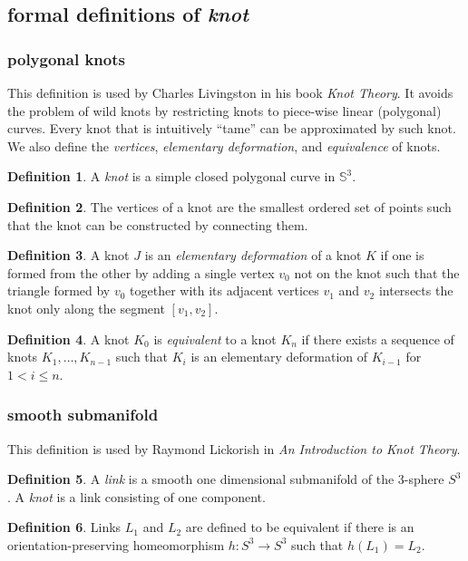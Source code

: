 \documentclass[12pt]{article}
\theoremstyle{definition}
\newtheorem*{defn}{Definition}
\begin{document}
\subsection*{formal definitions of \emph{knot}}
\subsubsection*{polygonal knots}
This definition is used by Charles Livingston in his book \emph{Knot Theory}. It avoids the problem of wild knots by restricting knots to piece-wise linear (polygonal) curves. Every knot that is intuitively ``tame'' can be approximated by such knot. We also define the \emph{vertices}, \emph{elementary deformation}, and \emph{equivalence} of knots.
\begin{defn}
A \emph{knot} is a simple closed polygonal curve in $\mathbb{S}^3$.
\end{defn}
\begin{defn}
The vertices of a knot are the smallest ordered set of points such that the knot can be constructed by connecting them.
\end{defn}
\begin{defn}
A knot $J$ is an \emph{elementary deformation} of a knot $K$ if one is formed from the other by adding a single vertex $v_0$ not on the knot such that the triangle formed by $v_0$ together with its adjacent vertices $v_1$ and $v_2$ intersects the knot only along the segment $[v_1,v_2]$.
\end{defn}
\begin{defn}
A knot $K_0$ is \emph{equivalent} to a knot $K_n$ if there exists a sequence of knots $K_1,\hdots,K_{n-1}$ such that $K_i$ is an elementary deformation of $K_{i-1}$ for $1<i\leq n$.
\end{defn}
\subsubsection*{smooth submanifold}
This definition is used by Raymond Lickorish in \emph{An Introduction to Knot Theory}.
\begin{defn}
A \emph{link} is a smooth one dimensional submanifold of the 3-sphere $S^3$.  A \emph{knot} is a link consisting of one component.
\end{defn}
\begin{defn}
Links $L_1$ and $L_2$ are defined to be equivalent if there is an orientation-preserving homeomorphism $h: S^3 \to S^3$ such that $h(L_1) = L_2$.
\end{defn}
\end{document}
